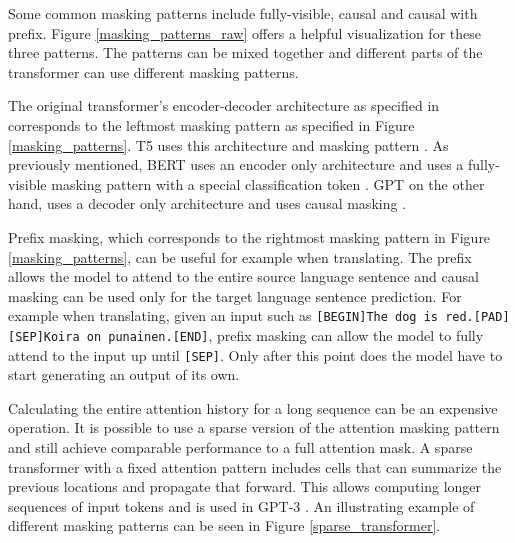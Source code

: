 \documentclass[twoside]{article}
\begin{document}
Some common masking patterns include fully-visible, causal and causal with prefix.
Figure \ref{masking_patterns_raw} offers a helpful visualization for these three
patterns. 
The patterns can be mixed together and different parts of the transformer can use different
masking patterns.

The original transformer's encoder-decoder architecture as specified in 
\cite{vaswani_attention_2017} corresponds to the leftmost masking pattern as
specified in Figure \ref{masking_patterns}. T5 uses this architecture and masking pattern
\cite{raffel_exploring_2020}. As previously mentioned, BERT uses an encoder
only architecture \cite{devlin_bert_2019} and uses a fully-visible masking 
pattern with a special classification token \cite{raffel_exploring_2020}. GPT on
the other hand, uses a decoder only architecture \cite{radford_improving_nodate}
and uses causal masking \cite{liu_generating_2018}.

Prefix masking, which corresponds to the rightmost masking pattern in Figure 
\ref{masking_patterns}, can be useful for example when translating. The prefix allows the
model to attend to the entire source language sentence and causal masking can be 
used only for the target language sentence prediction. For example when translating, given an input
such as \texttt{[BEGIN]The dog is red.[PAD][SEP]Koira on punainen.[END]}, prefix masking 
can allow the model to fully attend to the input up until \texttt{[SEP]}. Only after this
point does the model have to start generating an output of its own.
 \cite{raffel_exploring_2020}

Calculating the entire attention history for a long sequence can be an expensive operation.
It is possible to use a sparse version of the attention masking pattern and still achieve 
comparable performance to a full attention mask. A sparse transformer with a fixed attention
pattern includes cells that can summarize the previous locations and propagate 
that forward. This allows computing longer sequences of input tokens and is used in GPT-3
\cite{brown_language_2020}. An illustrating example of different masking patterns
can be seen in Figure \ref{sparse_transformer}. \cite{child_generating_2019}
\end{document}

